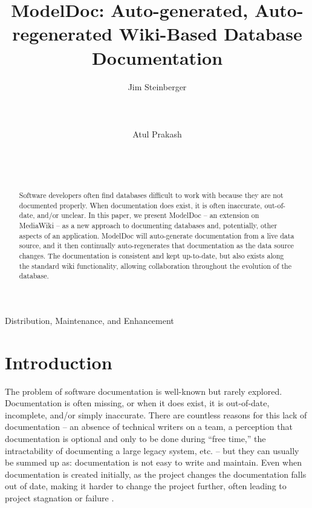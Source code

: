 \documentclass{acm_proc_article-sp}
\begin{document}
\title{{\ttlit ModelDoc}: Auto-generated, Auto-regenerated Wiki-Based Database Documentation}

\author{
  \alignauthor
  Jim Steinberger\\
         \\
         \\
         \\
  \alignauthor
  Atul Prakash\\
         \\
         \\
         \\
}

\maketitle

\begin{abstract}
Software developers often find databases difficult to work with because they
are not documented properly.  When documentation does exist, it is often
inaccurate, out-of-date, and/or unclear.  In this paper, we present ModelDoc --
an extension on MediaWiki -- as a new approach to documenting databases and,
potentially, other aspects of an application.  ModelDoc will auto-generate
documentation from a live data source, and it then continually auto-regenerates
that documentation as the data source changes.  The documentation is consistent
and kept up-to-date, but also exists along the standard wiki functionality,
allowing collaboration throughout the evolution of the database.
\end{abstract}

{Distribution, Maintenance, and Enhancement}


\section{Introduction}
The problem of software documentation is well-known but rarely explored. 
Documentation is often missing, or when it does exist, it is out-of-date,
incomplete, and/or simply inaccurate.  There are countless reasons for
this lack of documentation -- an absence of technical writers on a team, a
perception that documentation is optional and only to be done during ``free
time,'' the intractability of documenting a large legacy system, etc. -- but
they can usually be summed up as: documentation is not easy to write and
maintain.  Even when documentation is created initially, as the project changes
the documentation falls out of date, making it harder to change the project
further, often leading to project stagnation or failure
\cite{desouza:documentation} \cite{sousa:maintenance}.
\end{document}

